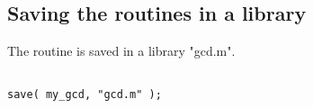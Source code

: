 \documentclass[a4paper,10pt]{article}
\begin{document}
\subsection{Saving the routines in a library}

The routine is saved in a library "gcd.m".

\begin{lstlisting}[name=gcd]

save( my_gcd, "gcd.m" );

\end{lstlisting}
\end{document}
